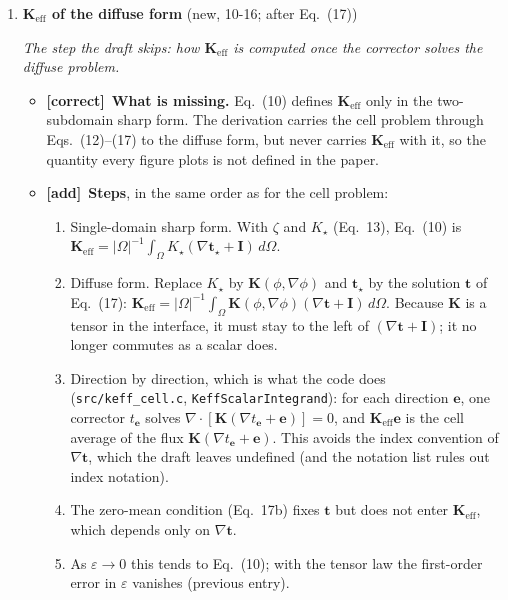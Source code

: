 \documentclass[11pt]{article}
\newcommand{\Pg}[3]{\item \textbf{#1} {\small(#2)}\par\textit{#3}}
\newcommand{\tC}{\textcolor{miss}{\textbf{[correct]}}\ }
\newcommand{\tA}{\textcolor{have}{\textbf{[add]}}\ }
\newcommand{\add}[1]{\textcolor{chk}{#1}}
\begin{document}
\begin{enumerate}
\Pg{$\mathbf{K}_{\mathrm{eff}}$ of the diffuse form}{\add{new, 10-16}; after Eq.~(17)}{The step the draft skips: how $\mathbf{K}_{\mathrm{eff}}$ is computed once the corrector solves the diffuse problem.}
  \begin{itemize}
  \item \tC \textbf{What is missing.} Eq.~(10) defines
    $\mathbf{K}_{\mathrm{eff}}$ only in the two-subdomain sharp form. The
    derivation carries the cell problem through Eqs.~(12)--(17) to the
    diffuse form, but never carries $\mathbf{K}_{\mathrm{eff}}$ with it, so
    the quantity every figure plots is not defined in the paper.
  \item \tA \textbf{Steps}, in the same order as for the cell problem:
    \begin{enumerate}
    \item Single-domain sharp form. With $\zeta$ and $K_\star$ (Eq.~13),
      Eq.~(10) is $\mathbf{K}_{\mathrm{eff}} = |\Omega|^{-1}\int_\Omega
      K_\star(\nabla\mathbf{t}_\star + \mathbf{I})\,d\Omega$.
    \item Diffuse form. Replace $K_\star$ by $\mathbf{K}(\phi,\nabla\phi)$
      and $\mathbf{t}_\star$ by the solution $\mathbf{t}$ of Eq.~(17):
      $\mathbf{K}_{\mathrm{eff}} = |\Omega|^{-1}\int_\Omega
      \mathbf{K}(\phi,\nabla\phi)(\nabla\mathbf{t} + \mathbf{I})\,d\Omega$.
      Because $\mathbf{K}$ is a tensor in the interface, it must stay to the
      left of $(\nabla\mathbf{t} + \mathbf{I})$; it no longer commutes as a
      scalar does.
    \item Direction by direction, which is what the code does
      (\texttt{src/keff\_cell.c}, \texttt{KeffScalarIntegrand}): for each
      direction $\mathbf{e}$, one corrector $t_{\mathbf{e}}$ solves
      $\nabla\cdot[\mathbf{K}(\nabla t_{\mathbf{e}} + \mathbf{e})] = 0$,
      and $\mathbf{K}_{\mathrm{eff}}\mathbf{e}$ is the cell average of the
      flux $\mathbf{K}(\nabla t_{\mathbf{e}} + \mathbf{e})$. This avoids
      the index convention of $\nabla\mathbf{t}$, which the draft leaves
      undefined (and the notation list rules out index notation).
    \item The zero-mean condition (Eq.~17b) fixes $\mathbf{t}$ but does not
      enter $\mathbf{K}_{\mathrm{eff}}$, which depends only on
      $\nabla\mathbf{t}$.
    \item As $\varepsilon \to 0$ this tends to Eq.~(10); with the tensor law
      the first-order error in $\varepsilon$ vanishes (previous entry).
    \end{enumerate}

\end{itemize}
\end{enumerate}
\end{document}
